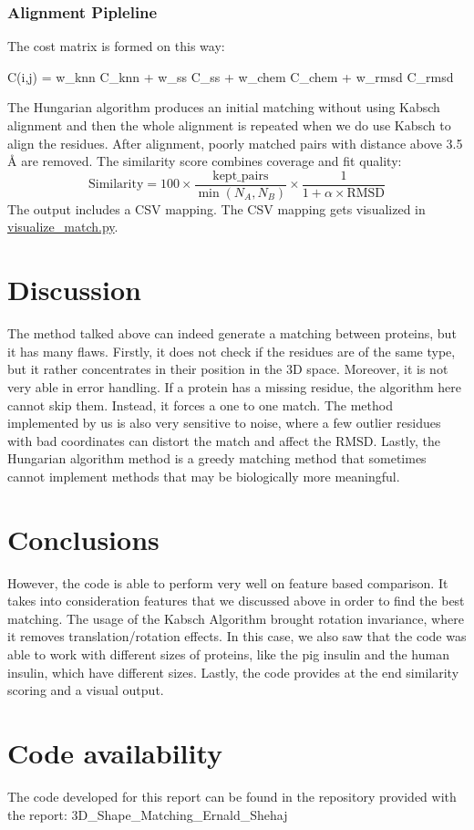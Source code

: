 \documentclass[\reportLanguage, twocolumn, 11pt]{article}
\begin{document}
\subsubsection{Alignment Pipleline}
The cost matrix is formed on this way:

C(i,j) = w_{knn} \times C_{knn} + w_{ss} \times C_{ss} + w_{chem} \times C_{chem} + w_{rmsd} \times C_{rmsd}

The Hungarian algorithm produces an initial matching without using Kabsch alignment and then the whole alignment is repeated when we do use Kabsch to align the residues. After alignment, poorly matched pairs with distance above 3.5 Å are removed. The similarity score combines coverage and fit quality:
$$\text{Similarity} = 100 \times \frac{\text{kept\_pairs}}{\min(N_A, N_B)} \times \frac{1}{1 + \alpha \times \text{RMSD}}$$
The output includes a CSV mapping. The CSV mapping gets visualized in \url{visualize_match.py}.

\section{Discussion}
The method talked above can indeed generate a matching between proteins, but it has many flaws. Firstly, it does not check if the residues are of the same type, but it rather concentrates in their position in the 3D space. Moreover, it is not very able in error handling. If a protein has a missing residue, the algorithm here cannot skip them. Instead, it forces a one to one match. The method implemented by us is also very sensitive to noise, where a few outlier residues with bad coordinates can distort the match and affect the RMSD. Lastly, the Hungarian algorithm method is a greedy matching method that sometimes cannot implement methods that may be biologically more meaningful. 
\section{Conclusions}
However, the code is able to perform very well on feature based comparison. It takes into consideration features that we discussed above in order to find the best matching. The usage of the Kabsch Algorithm brought rotation invariance, where it removes translation/rotation effects. In this case, we also saw that the code was able to work with different sizes of proteins, like the pig insulin and the human insulin, which have different sizes. Lastly, the code provides at the end similarity scoring and a visual output. 

\section{Code availability}
The code developed for this report can be found in the repository provided with the report:
3D_Shape_Matching_Ernald_Shehaj

\printbibliography
\end{document}
